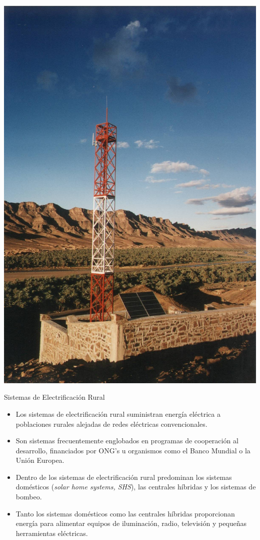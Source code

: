 \documentclass[xcolor={usenames,svgnames,dvipsnames}]{beamer}
\begin{document}
\begin{frame}[label={sec:org70190fb}]{}
\begin{center}
\includegraphics[height=0.95\textheight]{../figs/TelefoniaRural.jpg}
\end{center}
\end{frame}

\begin{frame}[label={sec:org9a746c9}]{Sistemas de Electrificación Rural}
\begin{itemize}
\item Los sistemas de electrificación rural suministran energía eléctrica
a poblaciones rurales alejadas de redes eléctricas convencionales.

\item Son sistemas frecuentemente englobados en programas de cooperación
al desarrollo, financiados por ONG's u organismos como el Banco
Mundial o la Unión Europea.

\item Dentro de los sistemas de electrificación rural predominan los
sistemas domésticos (\emph{solar home systems, SHS}), las centrales
híbridas y los sistemas de bombeo.

\item Tanto los sistemas domésticos como las centrales híbridas
proporcionan energía para alimentar equipos de iluminación, radio,
televisión y pequeñas herramientas eléctricas.
\end{itemize}
\end{frame}
\end{document}
